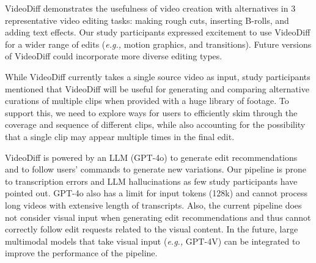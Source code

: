 




VideoDiff demonstrates the usefulness of video creation with alternatives in 3 representative video editing tasks: making rough cuts, inserting B-rolls, and adding text effects. 
Our study participants expressed excitement to use VideoDiff for a wider range of edits (\textit{e.g.,} motion graphics, and transitions). Future versions of VideoDiff could incorporate more diverse editing types.

While VideoDiff currently takes a single source video as input, study participants mentioned that VideoDiff will be useful for generating and comparing alternative curations of multiple clips when provided with a huge library of footage. To support this, we need to explore ways for users to efficiently skim through the coverage and sequence of different clips, while also accounting for the possibility that a single clip may appear multiple times in the final edit.

VideoDiff is powered by an LLM (GPT-4o) to generate edit recommendations and to follow users' commands to generate new variations. Our pipeline is prone to transcription errors and LLM hallucinations as few study participants have pointed out. GPT-4o also has a limit for input tokens (128k) and cannot process long videos with extensive length of transcripts.
Also, the current pipeline does not consider visual input when generating edit recommendations and thus cannot correctly follow edit requests related to the visual content. In the future, large multimodal models that take visual input (\textit{e.g.,} GPT-4V) can be integrated to improve the performance of the pipeline. 
